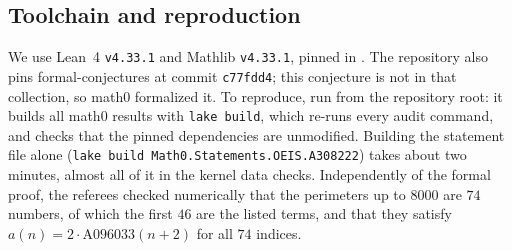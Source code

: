 \documentclass[11pt]{amsart}
\theoremstyle{plain}
\theoremstyle{definition}
\begin{document}
\subsection*{Toolchain and reproduction}
We use Lean~4 \cite{Lean4} \texttt{v4.33.1} and Mathlib \cite{Mathlib} \texttt{v4.33.1}, pinned in . The repository also pins formal-conjectures \cite{FC} at commit \texttt{c77fdd4}; this conjecture is not in that collection, so math0 formalized it. To reproduce, run  from the repository root: it builds all math0 results with \texttt{lake build}, which re-runs every audit command, and checks that the pinned dependencies are unmodified. Building the statement file alone (\texttt{lake build Math0.Statements.OEIS.A308222}) takes about two minutes, almost all of it in the kernel data checks. Independently of the formal proof, the referees checked numerically that the perimeters up to $8000$ are $74$ numbers, of which the first $46$ are the listed terms, and that they satisfy $a(n)=2\cdot\mathrm{A096033}(n+2)$ for all $74$ indices.
\end{document}
